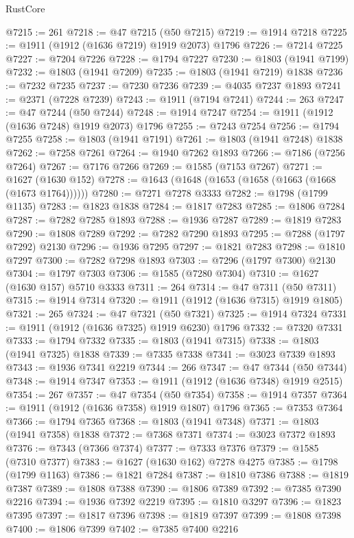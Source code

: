 \begin{lexlean}{RustCore}
\begin{coremodule}
@7215 := 261
@7218 := @47 @7215 (@50 @7215)
@7219 := @1914 @7218
@7225 := @1911 (@1912 (@1636 @7219) @1919 @2073) @1796
@7226 := @7214 @7225
@7227 := @7204 @7226
@7228 := @1794 @7227
@7230 := @1803 (@1941 @7199)
@7232 := @1803 (@1941 @7209)
@7235 := @1803 (@1941 @7219) @1838
@7236 := @7232 @7235
@7237 := @7230 @7236
@7239 := @4035 @7237 @1893
@7241 := @2371 (@7228 @7239)
@7243 := @1911 (@7194 @7241)
@7244 := 263
@7247 := @47 @7244 (@50 @7244)
@7248 := @1914 @7247
@7254 := @1911 (@1912 (@1636 @7248) @1919 @2073) @1796
@7255 := @7243 @7254
@7256 := @1794 @7255
@7258 := @1803 (@1941 @7191)
@7261 := @1803 (@1941 @7248) @1838
@7262 := @7258 @7261
@7264 := @1940 @7262 @1893
@7266 := @7186 (@7256 @7264)
@7267 := @7176 @7266
@7269 := @1585 (@7153 @7267)
@7271 := @1627 (@1630 @152)
@7278 := @1643 (@1648 (@1653 (@1658 (@1663 (@1668 (@1673 @1764))))))
@7280 := @7271 @7278 @3333
@7282 := @1798 (@1799 @1135)
@7283 := @1823 @1838
@7284 := @1817 @7283
@7285 := @1806 @7284
@7287 := @7282 @7285 @1893
@7288 := @1936 @7287
@7289 := @1819 @7283
@7290 := @1808 @7289
@7292 := @7282 @7290 @1893
@7295 := @7288 (@1797 @7292) @2130
@7296 := @1936 @7295
@7297 := @1821 @7283
@7298 := @1810 @7297
@7300 := @7282 @7298 @1893
@7303 := @7296 (@1797 @7300) @2130
@7304 := @1797 @7303
@7306 := @1585 (@7280 @7304)
@7310 := @1627 (@1630 @157) @5710 @3333
@7311 := 264
@7314 := @47 @7311 (@50 @7311)
@7315 := @1914 @7314
@7320 := @1911 (@1912 (@1636 @7315) @1919 @1805)
@7321 := 265
@7324 := @47 @7321 (@50 @7321)
@7325 := @1914 @7324
@7331 := @1911 (@1912 (@1636 @7325) @1919 @6230) @1796
@7332 := @7320 @7331
@7333 := @1794 @7332
@7335 := @1803 (@1941 @7315)
@7338 := @1803 (@1941 @7325) @1838
@7339 := @7335 @7338
@7341 := @3023 @7339 @1893
@7343 := @1936 @7341 @2219
@7344 := 266
@7347 := @47 @7344 (@50 @7344)
@7348 := @1914 @7347
@7353 := @1911 (@1912 (@1636 @7348) @1919 @2515)
@7354 := 267
@7357 := @47 @7354 (@50 @7354)
@7358 := @1914 @7357
@7364 := @1911 (@1912 (@1636 @7358) @1919 @1807) @1796
@7365 := @7353 @7364
@7366 := @1794 @7365
@7368 := @1803 (@1941 @7348)
@7371 := @1803 (@1941 @7358) @1838
@7372 := @7368 @7371
@7374 := @3023 @7372 @1893
@7376 := @7343 (@7366 @7374)
@7377 := @7333 @7376
@7379 := @1585 (@7310 @7377)
@7383 := @1627 (@1630 @162) @7278 @4275
@7385 := @1798 (@1799 @1163)
@7386 := @1821 @7284
@7387 := @1810 @7386
@7388 := @1819 @7387
@7389 := @1808 @7388
@7390 := @1806 @7389
@7392 := @7385 @7390 @2216
@7394 := @1936 @7392 @2219
@7395 := @1810 @3297
@7396 := @1823 @7395
@7397 := @1817 @7396
@7398 := @1819 @7397
@7399 := @1808 @7398
@7400 := @1806 @7399
@7402 := @7385 @7400 @2216

\end{coremodule}
\end{lexlean}
